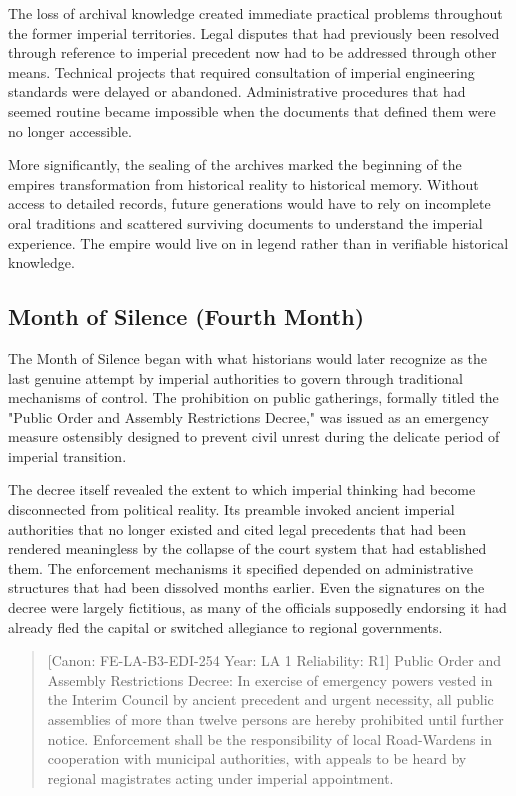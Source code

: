 The loss of archival knowledge created immediate practical problems
throughout the former imperial territories. Legal disputes that had
previously been resolved through reference to imperial precedent now had
to be addressed through other means. Technical projects that required
consultation of imperial engineering standards were delayed or
abandoned. Administrative procedures that had seemed routine became
impossible when the documents that defined them were no longer
accessible.

More significantly, the sealing of the archives marked the beginning of
the empire\textquotesingle s transformation from historical reality to
historical memory. Without access to detailed records, future
generations would have to rely on incomplete oral traditions and
scattered surviving documents to understand the imperial experience. The
empire would live on in legend rather than in verifiable historical
knowledge.

\subsection{Month of Silence (Fourth
Month)}\label{month-of-silence-fourth-month}

The Month of Silence began with what historians would later recognize as
the last genuine attempt by imperial authorities to govern through
traditional mechanisms of control. The prohibition on public gatherings,
formally titled the "Public Order and Assembly Restrictions Decree," was
issued as an emergency measure ostensibly designed to prevent civil
unrest during the delicate period of imperial transition.

The decree itself revealed the extent to which imperial thinking had
become disconnected from political reality. Its preamble invoked ancient
imperial authorities that no longer existed and cited legal precedents
that had been rendered meaningless by the collapse of the court system
that had established them. The enforcement mechanisms it specified
depended on administrative structures that had been dissolved months
earlier. Even the signatures on the decree were largely fictitious, as
many of the officials supposedly endorsing it had already fled the
capital or switched allegiance to regional governments.

\begin{quote}
{[}Canon: FE-LA-B3-EDI-254 \textbar{} Year: LA 1 \textbar{} Reliability:
R1{]} Public Order and Assembly Restrictions Decree: In exercise of
emergency powers vested in the Interim Council by ancient precedent and
urgent necessity, all public assemblies of more than twelve persons are
hereby prohibited until further notice. Enforcement shall be the
responsibility of local Road-Wardens in cooperation with municipal
authorities, with appeals to be heard by regional magistrates acting
under imperial appointment.
\end{quote}

